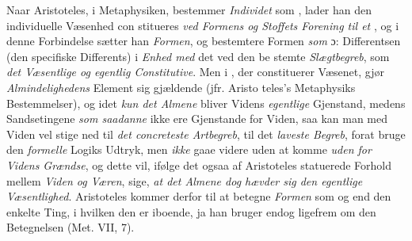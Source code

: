 Naar Aristoteles, i Metaphysiken, bestemmer \emph{Individet}
som \emph{}, lader han den individuelle Væsenhed con\-%
stitueres \emph{ved Formens og Stoffets Forening til et}
\emph{}, og i denne Forbindelse sætter han \emph{Formen}, og
bestemtere Formen \emph{som} \emph{} ɔ: Differentsen
 \setcounter{footnote}{0}
(den specifiske Differents) i \emph{Enhed med} det ved den be\-%
stemte \emph{Slægtbegreb}, som \emph{det Væsentlige og egentlig
Constitutive}. Men i , der constituerer Væsenet, gjør
\emph{Almindelighedens} Element sig gjældende (jfr. Aristo\-%
teles's Metaphysiks Bestemmelser), og idet \emph{kun det Almene}
bliver Videns \emph{egentlige} Gjenstand, medens Sandsetingene
\emph{som saadanne} ikke ere Gjenstande for Viden, saa kan man
med Viden vel stige ned til \emph{det concreteste Artbegreb},
til det \emph{laveste Begreb}, forat bruge den \emph{formelle}
Logiks Udtryk, men \emph{ikke} gaae videre uden at komme \emph{uden\-%
for Videns Grændse}, og dette vil, ifølge det ogsaa af
Aristoteles statuerede Forhold mellem \emph{Viden og Væren},
sige, \emph{at det Almene dog hævder sig den egentlige
Væsentlighed}. Aristoteles kommer derfor til at betegne
\emph{Formen} som \emph{} og \emph{} end den enkelte
Ting, i hvilken den er iboende, ja han bruger endog ligefrem
om den Betegnelsen \emph{} (Met. VII, 7).

